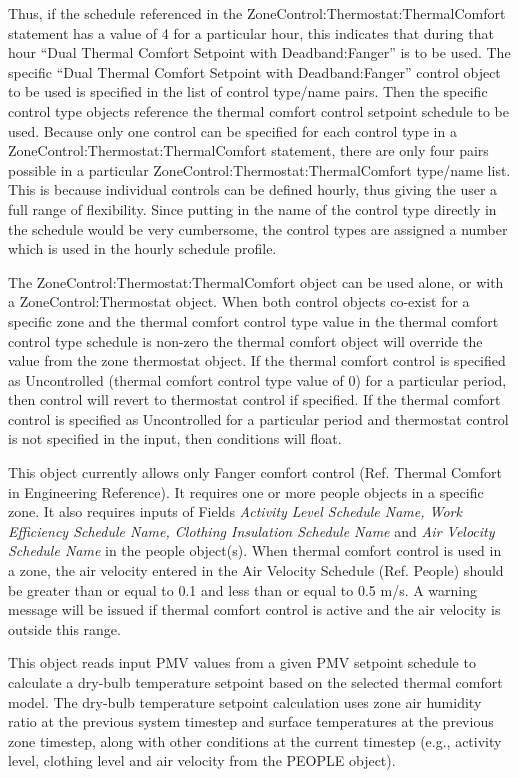 Thus, if the schedule referenced in the ZoneControl:Thermostat:ThermalComfort statement has a value of 4 for a particular hour, this indicates that during that hour ``Dual Thermal Comfort Setpoint with Deadband:Fanger'' is to be used. The specific ``Dual Thermal Comfort Setpoint with Deadband:Fanger'' control object to be used is specified in the list of control type/name pairs. Then the specific control type objects reference the thermal comfort control setpoint schedule to be used. Because only one control can be specified for each control type in a ZoneControl:Thermostat:ThermalComfort statement, there are only four pairs possible in a particular ZoneControl:Thermostat:ThermalComfort type/name list. This is because individual controls can be defined hourly, thus giving the user a full range of flexibility. Since putting in the name of the control type directly in the schedule would be very cumbersome, the control types are assigned a number which is used in the hourly schedule profile.

The ZoneControl:Thermostat:ThermalComfort object can be used alone, or with a ZoneControl:Thermostat object. When both control objects co-exist for a specific zone and the thermal comfort control type value in the thermal comfort control type schedule is non-zero the thermal comfort object will override the value from the zone thermostat object. If the thermal comfort control is specified as Uncontrolled (thermal comfort control type value of 0) for a particular period, then control will revert to thermostat control if specified. If the thermal comfort control is specified as Uncontrolled for a particular period and thermostat control is not specified in the input, then conditions will float.

This object currently allows only Fanger comfort control (Ref. Thermal Comfort in Engineering Reference). It requires one or more people objects in a specific zone. It also requires inputs of Fields \emph{Activity Level Schedule Name, Work Efficiency Schedule Name, Clothing Insulation Schedule Name} and \emph{Air Velocity Schedule Name} in the people object(s). When thermal comfort control is used in a zone, the air velocity entered in the Air Velocity Schedule (Ref. People) should be greater than or equal to 0.1 and less than or equal to 0.5 m/s. A warning message will be issued if thermal comfort control is active and the air velocity is outside this range.

This object reads input PMV values from a given PMV setpoint schedule to calculate a dry-bulb temperature setpoint based on the selected thermal comfort model. The dry-bulb temperature setpoint calculation uses zone air humidity ratio at the previous system timestep and surface temperatures at the previous zone timestep, along with other conditions at the current timestep (e.g., activity level, clothing level and air velocity from the PEOPLE object).

